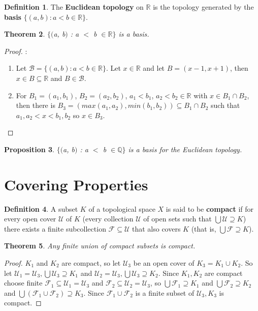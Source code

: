 \documentclass{amsart}
\theoremstyle{plain}
\newtheorem{theorem}{Theorem}
\newtheorem{proposition}[theorem]{Proposition}
\theoremstyle{definition}
\newtheorem{definition}[theorem]{Definition}
\theoremstyle{remark}
\begin{document}
	\begin{definition}
	The \textbf{Euclidean topology} on $\mathbb{R}$ is the topology generated by the \textbf{basis} \newline $\lbrace(a, b) : a < b \in \mathbb{R}\rbrace$.
	\end{definition}

	\begin{theorem}
	$\lbrace($a, b$)$ : a $<$ b $\in \mathbb{R}\rbrace$ is a basis.
	\end{theorem}
	\begin{proof}:\newline
		\begin{enumerate}
			\item Let $\mathcal{B} = \lbrace (a, b) : a < b \in \mathbb{R} \rbrace$. Let $x \in \mathbb{R}$ and let $B = (x-1, x+1)$, then $x \in B \subseteq \mathbb{R}$ and $B \in \mathcal{B}$.	
			\item For $B_1 = (a_1, b_1)$, $B_2 = (a_2, b_2)$, $a_1<b_1$, $a_2<b_2 \in \mathbb{R}$ with $x \in B_1 \cap B_2$, then there is $B_3 = ( max(a_1, a_2), min(b_1, b_2) ) \subseteq B_1 \cap B_2$ such that $a_1,a_2<x<b_1,b_2$ so $ x \in B_3$.
		\end{enumerate}
	\end{proof}

	\begin{proposition}
	$\lbrace($a, b$)$ : a $<$ b $\in \mathbb{Q}\rbrace$ is a basis for the Euclidean topology.
	\end{proposition}

\section{Covering Properties}

	\begin{definition}
	  A subset \(K\) of a topological space \(X\) is said to be \textbf{compact} if for every
	  open cover \(\mathcal U\) of \(K\) (every collection \(\mathcal U\) of open sets
	  such that \(\bigcup \mathcal U\supseteq K\)) there exists a finite subcollection
	  \(\mathcal F\subseteq \mathcal U\) that also covers \(K\) (that is,
	  \(\bigcup\mathcal F\supseteq K\)).
	\end{definition}

	\begin{theorem}
	  Any finite union of compact subsets is compact.
	\end{theorem}

	\begin{proof}
	$K_1$ and $K_2$ are compact, so let $\mathcal{U}_3$ be an open cover of $K_3 = K_1 \cup K_2$. So let $\mathcal{U}_1 = \mathcal{U}_3, \bigcup \mathcal{U}_3 \supseteq K_1$ and $\mathcal{U}_2 = \mathcal{U}_3, \bigcup \mathcal{U}_3 \supseteq K_2$. Since $K_1, K_2$ are compact choose finite $\mathcal{F}_1 \subseteq \mathcal{U}_1 = \mathcal{U}_3$ and $\mathcal{F}_2 \subseteq \mathcal{U}_2 = \mathcal{U}_3$, so $\bigcup \mathcal{F}_1 \supseteq K_1$ and $\bigcup \mathcal{F}_2 \supseteq K_2$ and $\bigcup (\mathcal{F}_1 \cup \mathcal{F}_2) \supseteq K_3$. Since $\mathcal{F}_1 \cup \mathcal{F}_2$ is a finite subset of $\mathcal{U}_3, K_3$ is compact.
	\end{proof}
\end{document}
